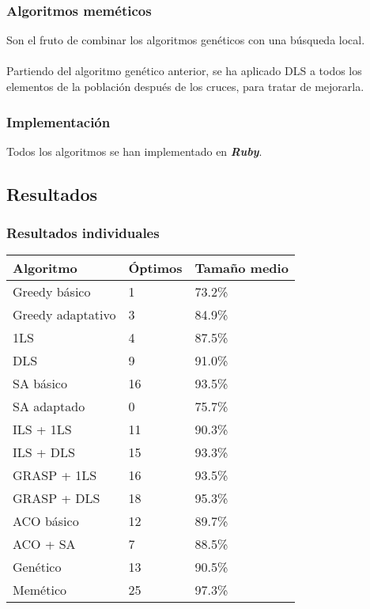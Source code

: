 \documentclass{beamer}
\begin{document}

\begin{frame}
  \frametitle{Algoritmos meméticos}
  Son el fruto de combinar los algoritmos genéticos con una búsqueda local.  \\~\\

  Partiendo del algoritmo genético anterior, se ha aplicado DLS a todos los elementos de la población después de
  los cruces, para tratar de mejorarla.

\end{frame}

\begin{frame}
  \frametitle{Implementación}

  Todos los algoritmos se han implementado en \textbf{\emph{Ruby}}.

\end{frame}



\subsection{Resultados}

\begin{frame}
\frametitle{Resultados individuales}

  \tiny
  \begin{table}
  \begin{tabular}{l l l}
    \textbf{Algoritmo} & \textbf{Óptimos} & \textbf{Tamaño medio}  \\ \hline
    Greedy básico          & 1  & 73.2\% \\ \hline
    Greedy adaptativo      & 3  & 84.9\% \\ \hline
    1LS                    & 4  & 87.5\% \\ \hline
    DLS                    & 9  & 91.0\% \\ \hline
    SA básico              & 16  & 93.5\% \\ \hline
    SA adaptado            & 0  & 75.7\% \\ \hline
    ILS + 1LS              & 11  & 90.3\% \\ \hline
    ILS + DLS              & 15  & 93.3\%  \\ \hline
    GRASP + 1LS            & 16  & 93.5\% \\ \hline
    GRASP + DLS            & 18  & 95.3\% \\ \hline
    ACO básico             & 12  & 89.7\% \\ \hline
    ACO + SA               & 7  & 88.5\% \\ \hline
    Genético               & 13  & 90.5\% \\ \hline
    Memético               & 25  & 97.3\% \\ \hline
    \end{tabular}
  \end{table}
\end{frame}
\end{document}
